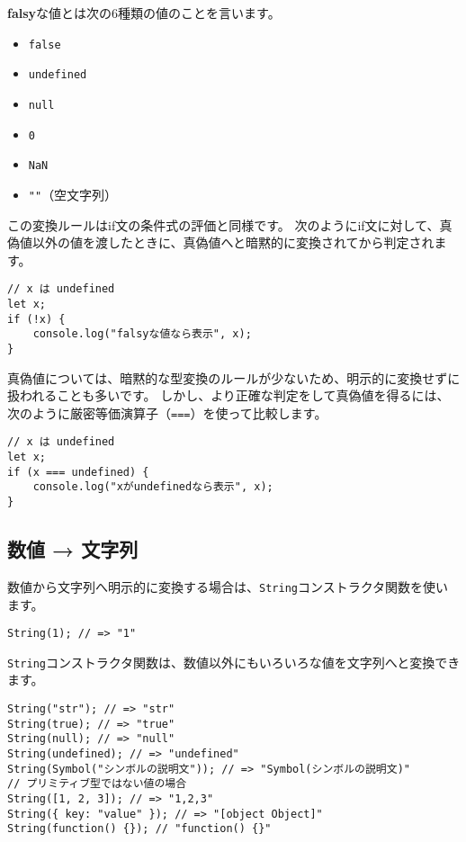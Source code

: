 \textbf{falsy}な値とは次の6種類の値のことを言います。

\begin{itemize}
\item
  \texttt{false}
\item
  \texttt{undefined}
\item
  \texttt{null}
\item
  \texttt{0}
\item
  \texttt{NaN}
\item
  \texttt{""}（空文字列）
\end{itemize}

この変換ルールはif文の条件式の評価と同様です。
次のようにif文に対して、真偽値以外の値を渡したときに、真偽値へと暗黙的に変換されてから判定されます。

\begin{lstlisting}
// x は undefined
let x; 
if (!x) {
    console.log("falsyな値なら表示", x); 
}
\end{lstlisting}

真偽値については、暗黙的な型変換のルールが少ないため、明示的に変換せずに扱われることも多いです。
しかし、より正確な判定をして真偽値を得るには、次のように厳密等価演算子（\texttt{===}）を使って比較します。

\begin{lstlisting}
// x は undefined
let x;
if (x === undefined) {
    console.log("xがundefinedなら表示", x); 
}
\end{lstlisting}

\hypertarget{number-to-string}{%
\subsection{数値 → 文字列}\label{number-to-string}}

数値から文字列へ明示的に変換する場合は、\texttt{String}コンストラクタ関数を使います。

\begin{lstlisting}
String(1); // => "1"
\end{lstlisting}

\texttt{String}コンストラクタ関数は、数値以外にもいろいろな値を文字列へと変換できます。

\begin{lstlisting}
String("str"); // => "str"
String(true); // => "true"
String(null); // => "null"
String(undefined); // => "undefined"
String(Symbol("シンボルの説明文")); // => "Symbol(シンボルの説明文)"
// プリミティブ型ではない値の場合
String([1, 2, 3]); // => "1,2,3"
String({ key: "value" }); // => "[object Object]"
String(function() {}); // "function() {}"
\end{lstlisting}


